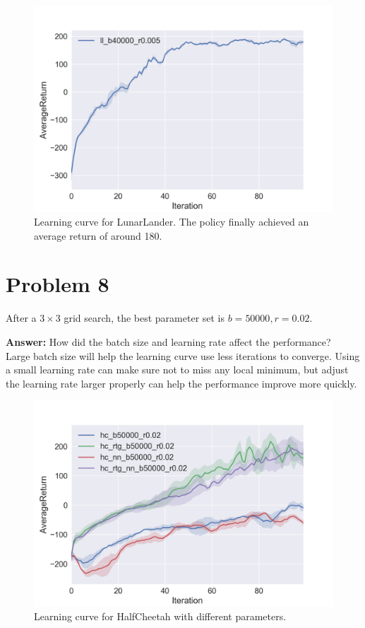 \documentclass[12pt]{article}
\begin{document}
\begin{figure}[!h]
\centering
\includegraphics[width=5in]{Figure_4.png}
\caption{Learning curve for LunarLander. The policy finally achieved an average return of around 180.}
\end{figure}

\section{Problem 8}
After a $3 \times 3$ grid search, the best parameter set is $b = 50000, r = 0.02$.

\textbf{Answer:} How did the batch size and learning rate affect the performance? \\
Large batch size will help the learning curve use less iterations to converge. Using a small learning rate can make sure not to miss any local minimum, but adjust the learning rate larger properly can help the performance improve more quickly.


\begin{figure}[!h]
\centering
\includegraphics[width=5in]{Figure_5.png}
\caption{Learning curve for HalfCheetah with different parameters.}
\end{figure}
\end{document}
